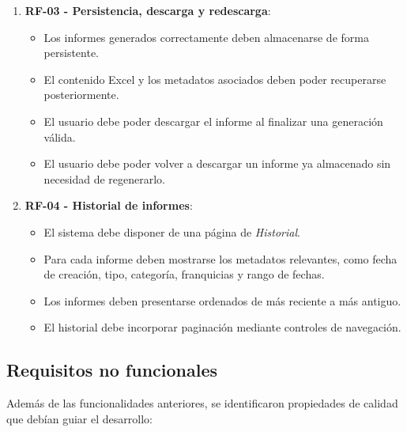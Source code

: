 \documentclass[11pt,a4paper,titlepage,oneside]{report}
\begin{document}
\begin{enumerate}
    \item \textbf{RF-03 - Persistencia, descarga y redescarga}:
    \begin{itemize}
        \item Los informes generados correctamente deben almacenarse de forma
        persistente.
        \item El contenido Excel y los metadatos asociados deben poder
        recuperarse posteriormente.
        \item El usuario debe poder descargar el informe al finalizar una
        generación válida.
        \item El usuario debe poder volver a descargar un informe ya almacenado
        sin necesidad de regenerarlo.
    \end{itemize}

    \item \textbf{RF-04 - Historial de informes}:
    \begin{itemize}
        \item El sistema debe disponer de una página de \textit{Historial}.
        \item Para cada informe deben mostrarse los metadatos relevantes, como
        fecha de creación, tipo, categoría, franquicias y rango de fechas.
        \item Los informes deben presentarse ordenados de más reciente a más
        antiguo.
        \item El historial debe incorporar paginación mediante controles de
        navegación.
    \end{itemize}

\end{enumerate}

\subsection{Requisitos no funcionales}

Además de las funcionalidades anteriores, se identificaron propiedades de
calidad que debían guiar el desarrollo:
\end{document}
